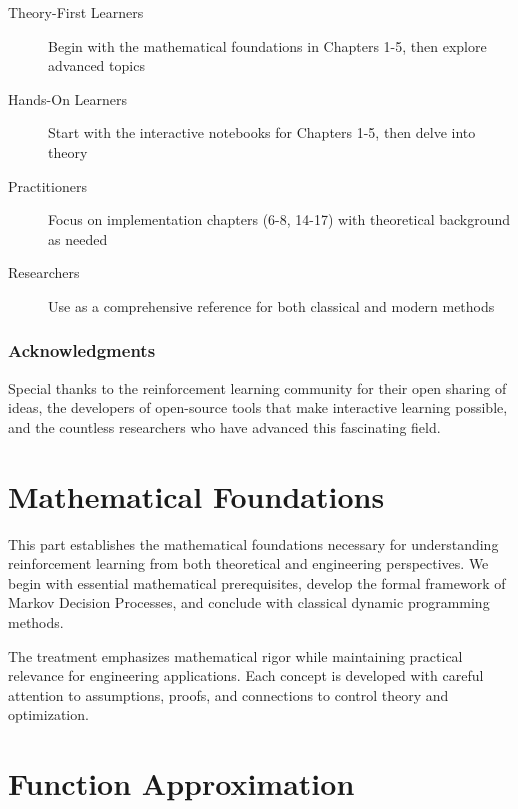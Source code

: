 \documentclass[11pt,twoside,openright]{book}
\begin{document}
\begin{description}
\item[Theory-First Learners] Begin with the mathematical foundations in Chapters 1-5, then explore advanced topics
\item[Hands-On Learners] Start with the interactive notebooks for Chapters 1-5, then delve into theory
\item[Practitioners] Focus on implementation chapters (6-8, 14-17) with theoretical background as needed
\item[Researchers] Use as a comprehensive reference for both classical and modern methods
\end{description}

\section*{Acknowledgments}

Special thanks to the reinforcement learning community for their open sharing of ideas, the developers of open-source tools that make interactive learning possible, and the countless researchers who have advanced this fascinating field.

\tableofcontents

\mainmatter

\part{Mathematical Foundations}

This part establishes the mathematical foundations necessary for understanding reinforcement learning from both theoretical and engineering perspectives. We begin with essential mathematical prerequisites, develop the formal framework of Markov Decision Processes, and conclude with classical dynamic programming methods.

The treatment emphasizes mathematical rigor while maintaining practical relevance for engineering applications. Each concept is developed with careful attention to assumptions, proofs, and connections to control theory and optimization.







\part{Function Approximation}
\end{document}

